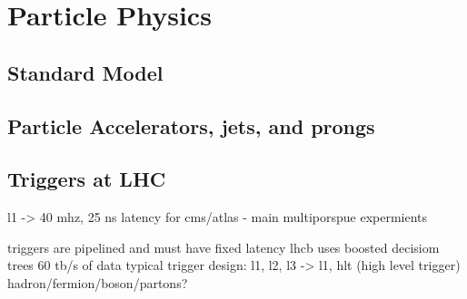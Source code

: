 \section{Particle Physics}

\subsection{Standard Model}

\subsection{Particle Accelerators, jets, and prongs}

\subsection{Triggers at LHC}
l1 -> 40 mhz, 25 ns latency for cms/atlas - main multiporspue expermients


triggers are pipelined and must have fixed latency
lhcb uses boosted decisiom trees
60 tb/s of data
typical trigger design: l1, l2, l3 -> l1, hlt (high level trigger)
hadron/fermion/boson/partons?
